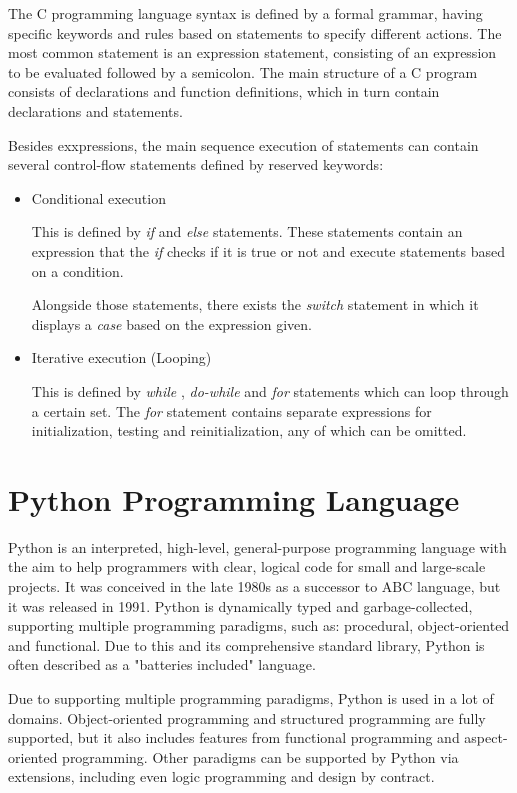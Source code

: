 \documentclass[12pt,a4paper,twoside]{report}
\begin{document}
 The C programming language syntax is defined by a formal grammar, having specific keywords and rules based on statements to specify different actions. The most common statement is an expression statement, consisting of an expression to be evaluated followed by a semicolon. The main structure of a C program consists of declarations and function definitions, which in turn contain declarations and statements. 
 
 Besides exxpressions, the main sequence execution of statements can contain several control-flow statements defined by reserved keywords:
  
 \begin{itemize}
 	\item Conditional execution 
 	
 		This is defined by \textit{if} and \textit{else} statements. These statements contain an expression that the \textit{if} checks if it is true or not and execute statements based on a condition.
 		
 		Alongside those statements, there exists the \textit{switch} statement in which it displays a \textit{case} based on the expression given.
 		
 	\item Iterative execution (Looping)
 	
 		This is defined by \textit{while} , \textit{do-while} and \textit{for} statements which can loop through a certain set. The \textit{for} statement contains separate expressions for initialization, testing and reinitialization, any of which can be omitted. 
 \end{itemize}


\section{Python Programming Language}

Python is an interpreted, high-level, general-purpose programming language with the aim to help programmers with clear, logical code for small and large-scale projects. It was conceived in the late 1980s as a successor to ABC language, but it was released in 1991. Python is dynamically typed and garbage-collected, supporting multiple programming paradigms, such as: procedural, object-oriented and functional. Due to this and its comprehensive standard library, Python is often described as a "batteries included" language. 

Due to supporting multiple programming paradigms, Python is used in a lot of domains. Object-oriented programming and structured programming are fully supported, but it also includes features from functional programming and aspect-oriented programming. Other paradigms can be supported by Python via extensions, including even logic programming and design by contract. 
\end{document}
